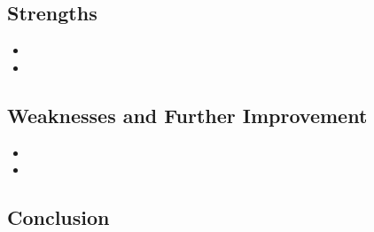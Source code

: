 \documentclass[12pt]{article}  %
\begin{document}
\subsection{Strengths}
\begin{itemize}
\item 

\item	
\end{itemize}

\subsection{Weaknesses and Further Improvement}
\begin{itemize}
\item 
\item	
 \end{itemize}








\subsection{Conclusion}










\end{document}
